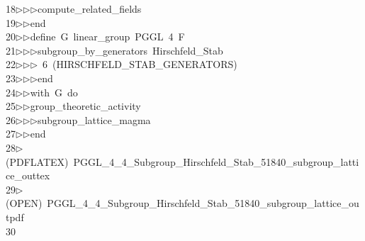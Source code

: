 \begin{tabbing}
18\>$\triangleright$\>$\triangleright$\>$\triangleright$\>compute\_related\_fields\ \\[0pt]
19\>$\triangleright$\>$\triangleright$\>end\ \\[0pt]
20\>$\triangleright$\>$\triangleright$\>define\ G\ linear\_group\ PGGL\ 4\ F\ \\[0pt]
21\>$\triangleright$\>$\triangleright$\>$\triangleright$\>subgroup\_by\_generators\ Hirschfeld\_Stab\ \\[0pt]
22\>$\triangleright$\>$\triangleright$\>$\triangleright$\ 6\ (HIRSCHFELD\_STAB\_GENERATORS)\ \\[0pt]
23\>$\triangleright$\>$\triangleright$\>$\triangleright$\>end\ \\[0pt]
24\>$\triangleright$\>$\triangleright$\>with\ G\ do\ \\[0pt]
25\>$\triangleright$\>$\triangleright$\>group\_theoretic\_activity\ \\[0pt]
26\>$\triangleright$\>$\triangleright$\>$\triangleright$\>subgroup\_lattice\_magma\ \\[0pt]
27\>$\triangleright$\>$\triangleright$\>end\\[0pt]
28\>$\triangleright$\>(PDFLATEX)\ PGGL\_4\_4\_Subgroup\_Hirschfeld\_Stab\_51840\_subgroup\_lattice\_outtex\\[0pt]
29\>$\triangleright$\>(OPEN)\ PGGL\_4\_4\_Subgroup\_Hirschfeld\_Stab\_51840\_subgroup\_lattice\_outpdf\\[0pt]
30\>\end{tabbing}
